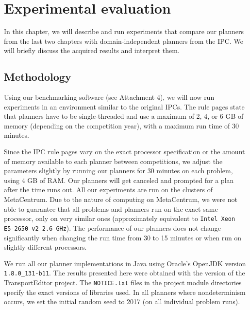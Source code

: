 \chapter{Experimental evaluation}\label{experiments}

In this chapter, we will describe and run experiments
that compare our planners from the last two chapters
with domain-independent planners from the IPC.
We will briefly discuss the acquired results and interpret them.

\section{Methodology}

Using our benchmarking software (see Attachment 4), we will now run experiments in an
environment similar to the original
IPCs. The rule pages state that
planners have to be single-threaded and use a maximum of 2, 4, or 6 GB of memory (depending on the competition year), with a maximum run time of 30 minutes.

Since the IPC rule pages vary on the exact processor specification or the amount of memory available to each planner between competitions,
we adjust the parameters slightly by running our planners
for 30 minutes on each problem, using 4 GB of RAM.
Our planners will get canceled and prompted for a plan after the time runs out. 
All our experiments are run on
the clusters of MetaCentrum.
Due to the nature of computing on MetaCentrum, we were not able to guarantee that all problems and planners
run on the exact same processor, only on very similar ones
(approximately equivalent to \texttt{Intel Xeon E5-2650 v2 2.6 GHz}).
The performance of our planners does not change significantly
when changing the run time from 30 to 15 minutes or when run
on slightly different processors.

We run all our planner implementations in Java using Oracle's OpenJDK 
version \texttt{1.8.0\_131-b11}.
The results presented here were obtained with the \TEver{} version of the TransportEditor project. The \texttt{NOTICE.txt} files
in the project module directories specify
the exact versions of libraries used.
In all planners where nondeterminism occurs,
we set the initial random seed to 2017
(on all individual problem runs).

